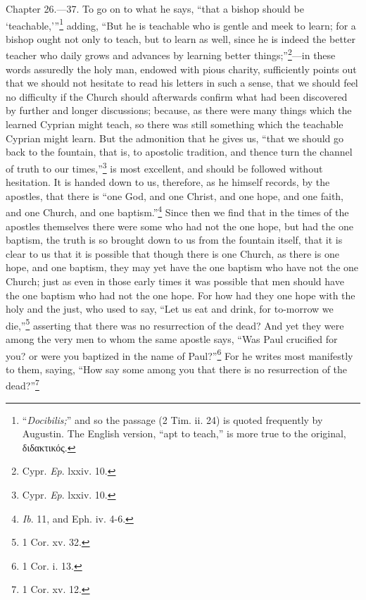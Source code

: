 Chapter 26.—37. To go on to what he says, ``that a bishop should be ‘teachable,’''\footnote{\par  ``\emph{Docibilis;}'' and so the passage (2 Tim. ii. 24) is quoted frequently by Augustin. The English version, ``apt to teach,'' is more true to the original, \textgreek{διδακτικός}.} adding, ``But he is teachable who is gentle and meek to learn; for a bishop ought not only to teach, but to learn as well, since he is indeed the better teacher who daily grows and advances by learning better things;''\footnote{\par  Cypr. \emph{Ep}. lxxiv. 10.}—in these words assuredly the holy man, endowed with pious charity, sufficiently points out that we should not hesitate to read his letters in such a sense, that we should feel no difficulty if the Church should afterwards confirm what had been discovered by further and longer discussions; because, as there were many things which the learned Cyprian might teach, so there was still something which the teachable Cyprian might learn. But the admonition that he gives us, ``that we should go back to the fountain, that is, to apostolic tradition, and thence turn the channel of truth to our times,''\footnote{\par  Cypr. \emph{Ep}. lxxiv. 10.} is most excellent, and should be followed without hesitation. It is handed down to us, therefore, as he himself records, by the apostles, that there is ``one God, and one Christ, and one hope, and one faith, and one Church, and one baptism.''\footnote{\par  \emph{Ib}. 11, and Eph. iv. 4-6.} Since then we find that in the times of the apostles themselves there were some who had not the one hope, but had the one baptism, the truth is so brought down to us from the fountain itself, that it is clear to us that it is possible that though there is one Church, as there is one hope, and one baptism, they may yet have the one baptism who have not the one Church; just as even in those early times it was possible that men should have the one baptism who had not the one hope. For how had they one hope with the holy and the just, who used to say, ``Let us eat and drink, for to-morrow we die,''\footnote{\par  1 Cor. xv. 32.} asserting that there was no resurrection of the dead? And yet they were among the very men to whom the same apostle says, ``Was Paul crucified for you? or were you baptized in the name of Paul?''\footnote{\par  1 Cor. i. 13.} For he writes most manifestly to them, saying, ``How say some among you that there is no resurrection of the dead?''\footnote{\par  1 Cor. xv. 12.}

